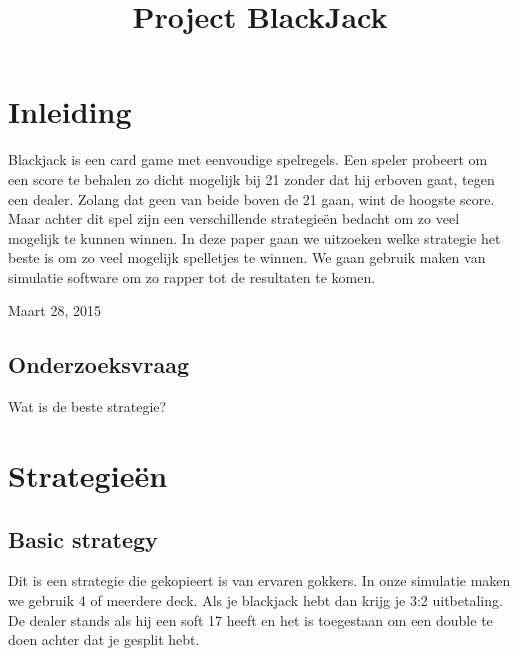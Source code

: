 \documentclass[conference]{IEEEtran}
\begin{document}
\title{Project BlackJack}
\author{
}
\maketitle

\IEEEpeerreviewmaketitle

\section{Inleiding}
Blackjack is een card game met eenvoudige spelregels. Een speler probeert om een score te behalen zo dicht mogelijk bij 21 zonder dat hij erboven gaat, tegen een dealer. Zolang dat geen van beide boven de 21 gaan, wint de hoogste score. Maar achter dit spel zijn een verschillende strategie\"en bedacht om zo veel mogelijk te kunnen winnen. In deze paper gaan we uitzoeken welke strategie het beste is om zo veel mogelijk spelletjes te winnen. We gaan gebruik maken van simulatie software om zo rapper tot de resultaten te komen.
 
\hfill Maart 28, 2015

\subsection{Onderzoeksvraag}
Wat is de beste strategie?



\section{Strategie\"en}



\subsection{Basic strategy}

Dit is een strategie die gekopieert is van ervaren gokkers. In onze simulatie maken we gebruik 4 of meerdere deck. Als je blackjack hebt dan krijg je 3:2 uitbetaling. De dealer stands als hij een soft 17 heeft en het is toegestaan om een double te doen achter dat je gesplit hebt. 
\end{document}
